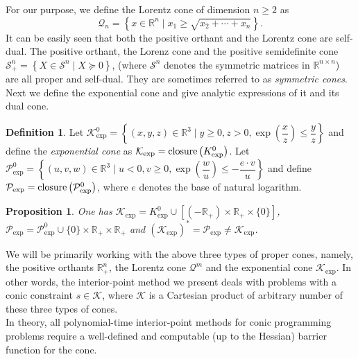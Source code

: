\documentclass[10pt]{article}
\theoremstyle{definition}
\newtheorem{defin}{Definition}
\theoremstyle{plain}
\newtheorem{prop}{Proposition}
\begin{document}
For our purpose, we define the \textnormal{Lorentz cone} of dimension $n\geq 2$ as
\[\mathcal{Q}_n = \left\{ x \in \mathbb{R}^n \mid x_1 \geq \sqrt{x_2+\cdots+x_n} \right\}.\]
It can be easily seen that both the positive orthant and the Lorentz cone are self-dual. The positive orthant, the Lorenz cone and the positive semidefinite cone $\mathcal{S}^n_+ = \left\{ X \in \mathcal{S}^{n} \mid X\succeq 0 \right\}$, (where $\mathcal{S}^n$ denotes the symmetric matrices in $\mathbb{R}^{n\times n}$) are all proper and self-dual. They are sometimes referred to as \textit{symmetric cones}. \\

Next we define the exponential cone and give analytic expressions of it and its dual cone.

\begin{defin}
	Let $\mathcal{K}^0_{\exp} = \left\{(x, y, z) \in \mathbb{R}^3 \mid y \geq 0, z > 0, \exp\left(\dfrac{x}{z}\right) \leq \dfrac{y}{z}\right\}$
	and define the \textit{exponential cone} as
	$\mathcal{K}_{\exp} = \textnormal{closure}\left(K^0_{\exp}\right)$. Let $\mathcal{P}^0_{\exp} = \left\{(u,v,w) \in \mathbb{R}^3 \mid u<0, v \geq 0, \exp\left(\dfrac{w}{u}\right)\leq -\dfrac{e\cdot v}{u} \right\}$
	and define $\mathcal{P}_{\exp} = \textnormal{closure} \left(\mathcal{P}^0_{\exp}\right)$,
	where $e$ denotes the base of natural logarithm. 
\end{defin}
\begin{prop}\label{K_exp=K0_exp_union_something}
	One has $\mathcal{K}_{\exp} = K^0_{\exp} \cup \left[\left(-\mathbb{R}_+\right) \times \mathbb{R}_+ \times \{0\} \right]$, $\mathcal{P}_{\exp} = \mathcal{P}^0_{\exp} \cup \{0\} \times \mathbb{R}_+ \times \mathbb{R}_+$ and $ (\mathcal{K}_{\exp})^* = \mathcal{P}_{\exp} \neq \mathcal{K}_{\exp}$.
\end{prop}

We will be primarily working with the above three types of proper cones, namely, the positive orthants $\mathbb{R}_+^{n}$, the Lorentz cone $\mathcal{Q}^m$ and the exponential cone $\mathcal{K}_{\exp}$. In other words, the interior-point method we present deals with problems with a conic constraint $s \in \mathcal{K}$, where $\mathcal{K}$ is a Cartesian product of arbitrary number of these three types of cones.\\

In theory, all polynomial-time interior-point methods for conic programming problems require a well-defined and computable (up to the Hessian) barrier function for the cone.
\end{document}
